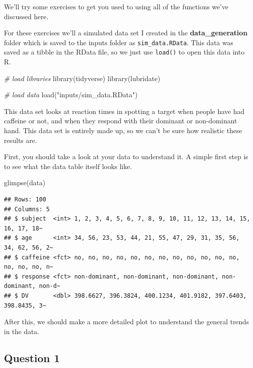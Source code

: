 \documentclass[
]{book}
\newenvironment{Shaded}{\begin{snugshade}}{\end{snugshade}}
\newcommand{\CommentTok}[1]{\textcolor[rgb]{0.56,0.35,0.01}{\textit{#1}}}
\newcommand{\FunctionTok}[1]{\textcolor[rgb]{0.00,0.00,0.00}{#1}}
\newcommand{\NormalTok}[1]{#1}
\newcommand{\StringTok}[1]{\textcolor[rgb]{0.31,0.60,0.02}{#1}}
\begin{document}
We'll try some exercises to get you used to using all of the functions we've discussed here.

For these exercises we'll a simulated data set I created in the \textbf{data\_generation} folder which is saved to the inputs folder as \texttt{sim\_data.RData}. This data was saved as a tibble in the RData file, so we just use \texttt{load()} to open this data into R.

\begin{Shaded}
\begin{Highlighting}[]
\CommentTok{\# load libraries}
\FunctionTok{library}\NormalTok{(tidyverse)}
\FunctionTok{library}\NormalTok{(lubridate)}

\CommentTok{\# load data}
\FunctionTok{load}\NormalTok{(}\StringTok{"inputs/sim\_data.RData"}\NormalTok{)}
\end{Highlighting}
\end{Shaded}

This data set looks at reaction times in spotting a target when people have had caffeine or not, and when they respond with their dominant or non-dominant hand. This data set is entirely made up, so we can't be sure how realistic these results are.

First, you should take a look at your data to understand it. A simple first step is to see what the data table itself looks like.

\begin{Shaded}
\begin{Highlighting}[]
\FunctionTok{glimpse}\NormalTok{(data)}
\end{Highlighting}
\end{Shaded}

\begin{verbatim}
## Rows: 100
## Columns: 5
## $ subject  <int> 1, 2, 3, 4, 5, 6, 7, 8, 9, 10, 11, 12, 13, 14, 15, 16, 17, 18~
## $ age      <int> 34, 56, 23, 53, 44, 21, 55, 47, 29, 31, 35, 56, 34, 62, 56, 2~
## $ caffeine <fct> no, no, no, no, no, no, no, no, no, no, no, no, no, no, no, n~
## $ response <fct> non-dominant, non-dominant, non-dominant, non-dominant, non-d~
## $ DV       <dbl> 398.6627, 396.3824, 400.1234, 401.9182, 397.6403, 398.8435, 3~
\end{verbatim}

After this, we should make a more detailed plot to understand the general trends in the data.

\hypertarget{question-1-4}{%
\subsection{Question 1}\label{question-1-4}}
\end{document}
